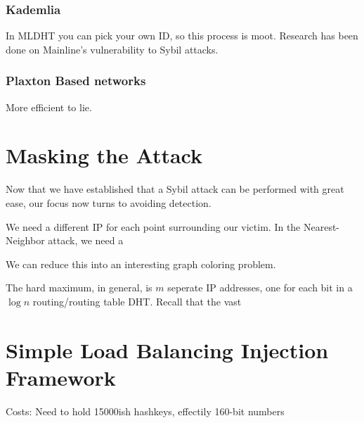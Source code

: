 \documentclass[a4paper]{IEEEtran}
\begin{document}
\subsubsection{Kademlia}
In MLDHT you can pick your own ID, so this process is moot.
Research has been done on Mainline's  vulnerability to Sybil attacks.

\subsubsection{Plaxton Based networks}
More efficient to lie.


\section{Masking the Attack}
Now that we have established that a Sybil attack can be performed with great ease, our focus now turns to avoiding detection.

We need a different IP for each point surrounding our victim.  In the Nearest-Neighbor attack, we need a 

We can reduce this into an interesting graph coloring problem.


The hard maximum, in general, is $m$ seperate IP addresses, one for each bit in a $\log n$ routing/routing table DHT.
Recall that the vast


\section{Simple Load Balancing Injection Framework}

Costs:  Need to hold 15000ish hashkeys, effectily 160-bit numbers



\end{document}
